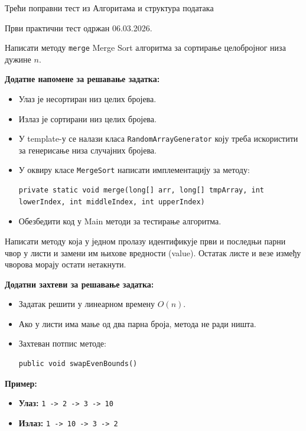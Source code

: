 
Трећи поправни тест из Алгоритама и структура података

Први практични тест одржан 06.03.2026.

Написати методу \texttt{merge} Merge Sort алгоритма за сортирање целобројног низа дужине $n$.

\textbf{Додатне напомене за решавање задатка:}
\begin{itemize}
	\item Улаз је несортиран низ целих бројева.
	\item Излаз је сортирани низ целих бројева.
	\item У template-у се налази класа \texttt{RandomArrayGenerator} коју треба искористити за генерисање низа случајних бројева.
	\item У оквиру класе \texttt{MergeSort} написати имплементацију за методу:
	\begin{Verbatim}[fontsize=\small]
private static void merge(long[] arr, long[] tmpArray, int lowerIndex, int middleIndex, int upperIndex)
	\end{Verbatim}
	\item Обезбедити код у Main методи за тестирање алгоритма.
\end{itemize}

Написати методу која у једном пролазу идентификује први и последњи парни чвор у листи и замени им њихове вредности (value). Остатак листе и везе између чворова морају остати нетакнути.

\textbf{Додатни захтеви за решавање задатка:}
\begin{itemize}
	\item Задатак решити у линеарном времену $O(n)$.
	\item Ако у листи има мање од два парна броја, метода не ради ништа.
	\item Захтеван потпис методе:
	\begin{Verbatim}[fontsize=\small]
public void swapEvenBounds()
	\end{Verbatim}
\end{itemize}

\textbf{Пример:}
\begin{itemize}
	\item \textbf{Улаз:} \texttt{1 -> 2 -> 3 -> 10}
	\item \textbf{Излаз:} \texttt{1 -> 10 -> 3 -> 2}
\end{itemize}

